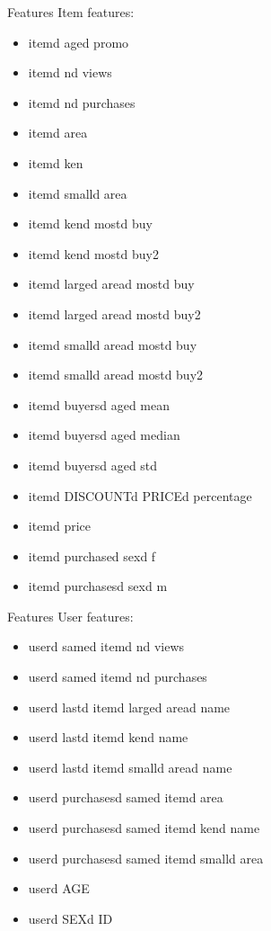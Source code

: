 \documentclass{beamer}
\begin{document}
\begin{frame}{Features}
	Item features:
	
\begin{itemize}
	\tiny
	\item itemd aged promo
	\item itemd nd views
	\item itemd nd purchases
	\item itemd area
	\item itemd ken
	\item itemd smalld area
	\item itemd kend mostd buy
	\item itemd kend mostd buy2
	\item itemd larged aread mostd buy
	\item itemd larged aread mostd buy2
	\item itemd smalld aread mostd buy
	\item itemd smalld aread mostd buy2
	\item itemd buyersd aged mean
	\item itemd buyersd aged median
	\item itemd buyersd aged std
	\item itemd DISCOUNTd PRICEd percentage
	\item itemd price
	\item itemd purchased sexd f
	\item itemd purchasesd sexd m
\end{itemize}
\end{frame}

\begin{frame}{Features}
	User features:
	\begin{itemize}
			\tiny
		\item userd samed itemd nd views
		\item userd samed itemd nd purchases
		\item userd lastd itemd larged aread name
		\item userd lastd itemd kend name
		\item userd lastd itemd smalld aread name
		\item userd purchasesd samed itemd area
		\item userd purchasesd samed itemd kend name
		\item userd purchasesd samed itemd smalld area
		\item userd AGE
		\item userd SEXd ID
	\end{itemize}
\end{frame}
\end{document}
